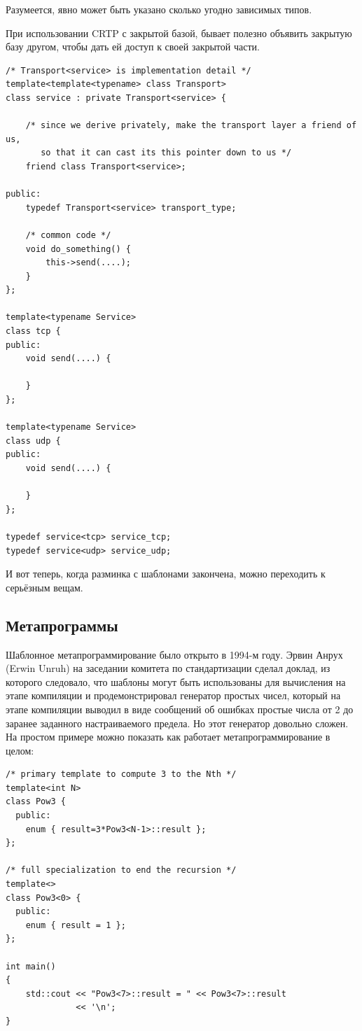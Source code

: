 \documentclass[a4paper,12pt,oneside]{article}
\begin{document}
Разумеется, явно может быть указано сколько угодно зависимых типов.

При использовании CRTP с закрытой базой, бывает полезно объявить закрытую базу другом, чтобы дать ей доступ к своей закрытой части.

\begin{lstlisting}
/* Transport<service> is implementation detail */
template<template<typename> class Transport>
class service : private Transport<service> {

    /* since we derive privately, make the transport layer a friend of us, 
       so that it can cast its this pointer down to us */
    friend class Transport<service>;

public:
    typedef Transport<service> transport_type;

    /* common code */
    void do_something() { 
        this->send(....);
    }
};

template<typename Service>
class tcp {
public:
    void send(....) {

    }
};

template<typename Service>
class udp {
public:
    void send(....) {

    }
};

typedef service<tcp> service_tcp;
typedef service<udp> service_udp;
\end{lstlisting}

И вот теперь, когда разминка с шаблонами закончена, можно переходить к серьёзным вещам.

\subsection{Метапрограммы}

Шаблонное метапрограммирование было открыто в 1994-м году. Эрвин Анрух (Erwin Unruh) на заседании комитета по стандартизации сделал доклад, из которого следовало, что шаблоны могут быть использованы для вычисления на этапе компиляции и продемонстрировал генератор простых чисел, который на этапе компиляции выводил в виде сообщений об ошибках простые числа от 2 до заранее заданного настраиваемого предела. Но этот генератор довольно сложен. На простом примере можно показать как работает метапрограммирование в целом:

\begin{lstlisting}
/* primary template to compute 3 to the Nth */
template<int N> 
class Pow3 { 
  public: 
    enum { result=3*Pow3<N-1>::result }; 
}; 

/* full specialization to end the recursion */
template<> 
class Pow3<0> { 
  public: 
    enum { result = 1 }; 
}; 

int main() 
{ 
    std::cout << "Pow3<7>::result = " << Pow3<7>::result 
              << '\n'; 
} 
\end{lstlisting}
\end{document}
